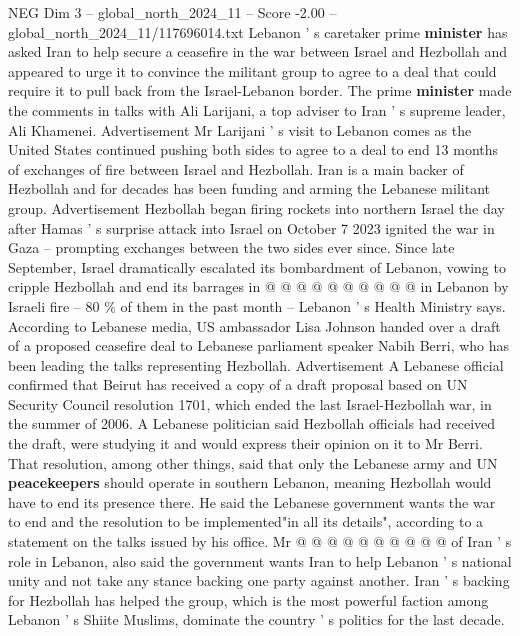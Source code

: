 \begin{textsample}{NEG Dim 3 – global\_north\_2024\_11 – Score -2.00 – global\_north\_2024\_11/117696014.txt}  \label{ex:f3_neg_274}
Lebanon ' s caretaker prime \textbf{minister} has asked Iran to help secure a ceasefire in the war between Israel and Hezbollah and appeared to urge it to convince the militant group to agree to a deal that could require it to pull back from the Israel-Lebanon border.
The prime \textbf{minister} made the comments in talks with Ali Larijani, a top adviser to Iran ' s supreme leader, Ali Khamenei.
Advertisement Mr Larijani ' s visit to Lebanon comes as the United States continued pushing both sides to agree to a deal to end 13 months of exchanges of fire between Israel and Hezbollah.
Iran is a main backer of Hezbollah and for decades has been funding and arming the Lebanese militant group.
Advertisement Hezbollah began firing rockets into northern Israel the day after Hamas ' s surprise attack into Israel on October 7 2023 ignited the war in Gaza -- prompting exchanges between the two sides ever since.
Since late September, Israel dramatically escalated its bombardment of Lebanon, vowing to cripple Hezbollah and end its barrages in @ @ @ @ @ @ @ @ @ @ in Lebanon by Israeli fire -- 80 \% of them in the past month -- Lebanon ' s Health Ministry says.
According to Lebanese media, US ambassador Lisa Johnson handed over a draft of a proposed ceasefire deal to Lebanese parliament speaker Nabih Berri, who has been leading the talks representing Hezbollah.
Advertisement A Lebanese official confirmed that Beirut has received a copy of a draft proposal based on UN Security Council resolution 1701, which ended the last Israel-Hezbollah war, in the summer of 2006.
A Lebanese politician said Hezbollah officials had received the draft, were studying it and would express their opinion on it to Mr Berri.
That resolution, among other things, said that only the Lebanese army and UN \textbf{peacekeepers} should operate in southern Lebanon, meaning Hezbollah would have to end its presence there.
He said the Lebanese government wants the war to end and the resolution to be implemented"in all its details", according to a statement on the talks issued by his office.
Mr @ @ @ @ @ @ @ @ @ @ of Iran ' s role in Lebanon, also said the government wants Iran to help Lebanon ' s national unity and not take any stance backing one party against another.
Iran ' s backing for Hezbollah has helped the group, which is the most powerful faction among Lebanon ' s Shiite Muslims, dominate the country ' s politics for the last decade.

\end{textsample}

